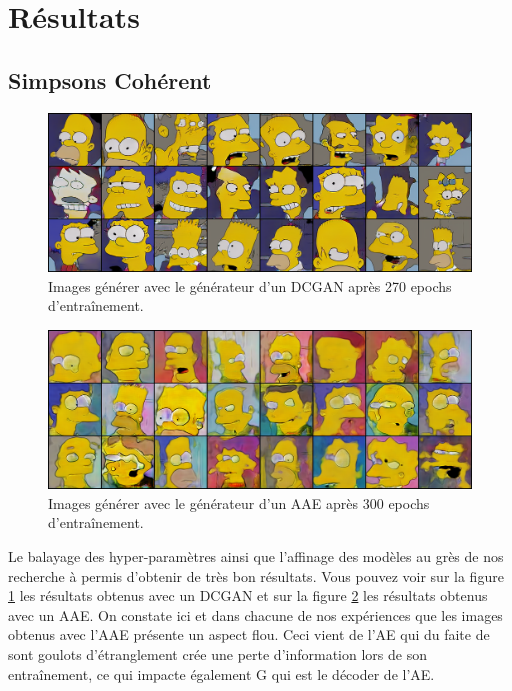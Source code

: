 \documentclass[11pt,francais]{article}
\begin{document}
\section{Résultats}

\subsection{Simpsons Cohérent}
\label{sec:SimpsonsCoherent}
\begin{figure}[!h]
    \centering
    \includegraphics[width=\textwidth]{Figures/resultats_simpsons/DCGAN_270.png}
    \caption{Images générer avec le générateur d'un DCGAN après 270 epochs d'entraînement.}
    \label{fig:fig3}
\end{figure}

\begin{figure}[!h]
    \centering
    \includegraphics[width=\textwidth]{Figures/resultats_simpsons/AAE_300.png}
    \caption{Images générer avec le générateur d'un AAE après 300 epochs d'entraînement.}
    \label{fig:fig4}
\end{figure}

Le balayage des hyper-paramètres ainsi que l'affinage des modèles au grès de nos recherche à permis d'obtenir de très bon résultats. Vous pouvez voir sur la figure \ref{fig:fig3} les résultats obtenus avec un DCGAN et sur la figure \ref{fig:fig4} les résultats obtenus avec un AAE.
On constate ici et dans chacune de nos expériences que les images obtenus avec l'AAE présente un aspect flou. Ceci vient de l'AE qui du faite de sont goulots d'étranglement crée une perte d'information lors de son entraînement, ce qui impacte également G qui est le décoder de l'AE.
\end{document}
